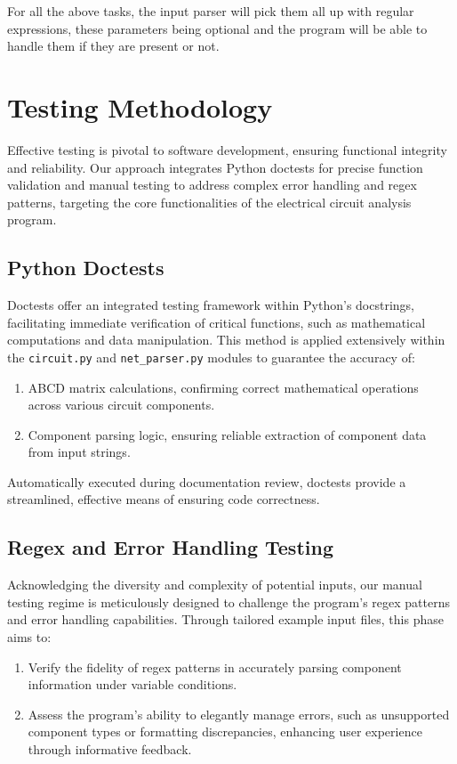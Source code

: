 \documentclass[conference]{IEEEtran}
\begin{document}
For all the above tasks, the input parser will pick them all up with regular expressions, these parameters being optional and the program will be able to handle them if they are present or not.
\newpage
\section{Testing Methodology}

Effective testing is pivotal to software development, ensuring functional integrity and reliability. Our approach integrates Python doctests for precise function validation and manual testing to address complex error handling and regex patterns, targeting the core functionalities of the electrical circuit analysis program.

\subsection{\textbf{Python Doctests}}
Doctests offer an integrated testing framework within Python's docstrings, facilitating immediate verification of critical functions, such as mathematical computations and data manipulation. This method is applied extensively within the \texttt{circuit.py} and \texttt{net\_parser.py} modules to guarantee the accuracy of:

\begin{enumerate}
    \item ABCD matrix calculations, confirming correct mathematical operations across various circuit components.
    \item Component parsing logic, ensuring reliable extraction of component data from input strings.
\end{enumerate}

Automatically executed during documentation review, doctests provide a streamlined, effective means of ensuring code correctness.

\subsection{\textbf{Regex and Error Handling Testing}}
Acknowledging the diversity and complexity of potential inputs, our manual testing regime is meticulously designed to challenge the program's regex patterns and error handling capabilities. Through tailored example input files, this phase aims to:

\begin{enumerate}
    \item Verify the fidelity of regex patterns in accurately parsing component information under variable conditions.
    \item Assess the program's ability to elegantly manage errors, such as unsupported component types or formatting discrepancies, enhancing user experience through informative feedback.
\end{enumerate}
\end{document}
